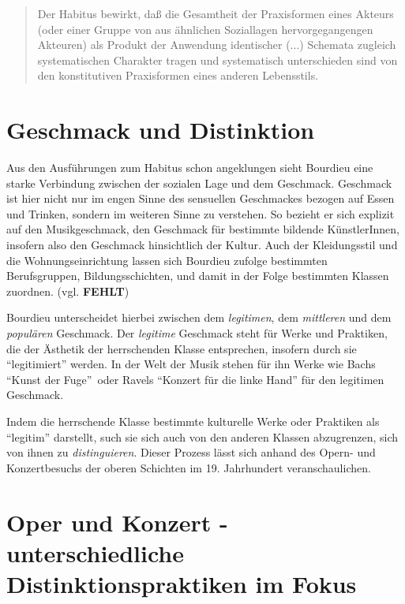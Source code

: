 \documentclass[a4paper, german, oneside]{scrbook}
\begin{document}
\blockquote[{\cite[278]{bourdieu_feinen_2012}}]{Der Habitus bewirkt, daß die Gesamtheit der Praxisformen eines Akteurs (oder einer Gruppe von aus ähnlichen Soziallagen hervorgegangengen Akteuren) als Produkt der Anwendung identischer (...) Schemata zugleich systematischen Charakter tragen und systematisch unterschieden sind von den konstitutiven Praxisformen eines anderen Lebensstils.}

\section{Geschmack und Distinktion}
Aus den Ausführungen zum Habitus schon angeklungen sieht Bourdieu eine starke Verbindung zwischen der sozialen Lage und dem Geschmack. Geschmack ist hier nicht nur im engen Sinne des sensuellen Geschmackes bezogen auf Essen und Trinken, sondern im weiteren Sinne zu verstehen. So bezieht er sich explizit auf den Musikgeschmack, den Geschmack für bestimmte bildende KünstlerInnen, insofern also den Geschmack hinsichtlich der Kultur. Auch der Kleidungsstil und die Wohnungseinrichtung lassen sich Bourdieu zufolge bestimmten Berufsgruppen, Bildungsschichten, und damit in der Folge bestimmten Klassen zuordnen. (vgl. \textbf{FEHLT})

Bourdieu unterscheidet hierbei zwischen dem \emph{legitimen}, dem \emph{mittleren} und dem \emph{populären} Geschmack. Der \emph{legitime} Geschmack steht für Werke und Praktiken, die der Ästhetik der herrschenden Klasse entsprechen, insofern durch sie \enquote{legitimiert} werden. \parencite[551]{joas_sozialtheorie:_2004} In der Welt der Musik stehen für ihn Werke wie Bachs \enquote{Kunst der Fuge} oder Ravels \enquote{Konzert für die linke Hand} für den legitimen Geschmack.

Indem die herrschende Klasse bestimmte kulturelle Werke oder Praktiken als \enquote{legitim} darstellt, such sie sich auch von den anderen Klassen abzugrenzen, sich von ihnen zu \emph{distinguieren}. Dieser Prozess lässt sich anhand des Opern- und Konzertbesuchs der oberen Schichten im 19. Jahrhundert veranschaulichen.


\section{Oper und Konzert - unterschiedliche Distinktionspraktiken im Fokus}
\label{operUndKonzert}
\end{document}
